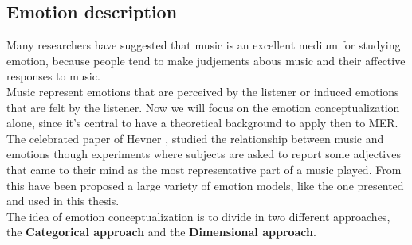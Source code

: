 \subsection{Emotion description}
Many researchers have suggested that music is an excellent medium for studying emotion, because people tend to make judjements abous music and their affective responses to music.
\\
Music represent emotions that are perceived by the listener or induced emotions that are felt by the listener. Now we will focus on the emotion conceptualization alone, since it's central to have a theoretical background to apply then to MER.
\\
The celebrated paper of Hevner \cite{hevner1935expression} , studied the relationship between music and emotions though experiments where subjects are asked to report some adjectives that came to their mind as the most representative part of a music played. From this have been proposed a large variety of emotion models, like the one presented and used in this thesis.
\\ \indent
The idea of emotion conceptualization is to divide in two different approaches, the \textbf{Categorical approach} and the \textbf{Dimensional approach}.

